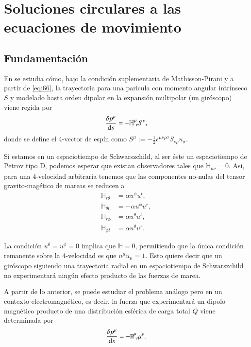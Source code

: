 \chapter{Soluciones circulares a las ecuaciones de movimiento}
\label{cap:4}
\newpage

\section{Fundamentación}

En \cite{Costa-Natario-Zilhao} se estudia cómo, bajo la condición suplementaria de Mathisson-Pirani y a partir de \eqref{eq:66}, la trayectoria para una paricula con momento angular intrínseco $S$ y modelado hasta orden dipolar en la expansión multipolar (un giróscopo) viene regida por
\begin{equation}
\frac{\delta p^{\mu}}{\mathrm{d}s} = -\mathbb{H}^{\mu}_{\ \nu} S^{\nu},
\end{equation}
donde se define el 4-vector de espín como $S^{\mu} := -\frac{1}{2} \epsilon^{\mu \nu \rho \sigma} S_{\nu \rho} u_{\sigma}$.

Si estamos en un espaciotiempo de Schwarszchild, al ser éste un espaciotiempo de Petrov tipo D, podemos esperar que existan observadores tales que $\mathbb{H}_{\mu \nu}=0$. Así, para una 4-velocidad arbitraria tenemos que las componentes no-nulas del tensor gravito-magético de mareas se reducen a
\begin{align}
\mathbb{H}_{r \theta} &= \alpha u^{\phi} u^{t},\\
\mathbb{H}_{\theta t} &= -\alpha u^{\phi} u^{r},\\
\mathbb{H}_{r \phi} &= \alpha u^{\theta} u^{t},\\
\mathbb{H}_{\phi t} &= \alpha u^{\theta} u^{r}.
\end{align}

La condición $u^{\theta} = u^{\phi} = 0$ implica que $\mathbb{H}=0$, permitiendo que la única condición remanente sobre la 4-velocidad es que $u^{\mu} u_{\mu} = 1$. Esto quiere decir que un giróscopo siguiendo una trayectoria radial en un espaciotiempo de Schwarszchild no experimentará ningún efecto producto de las fuerzas de marea.

A partir de lo anterior, se puede estudiar el problema análogo pero en un contexto electromagnético, es decir, la fuerza que experimentará un dipolo magnético producto de una distribución esférica de carga total $Q$ viene determinada por
\begin{equation}
\label{eq:magforce}
\frac{\delta p^{\mu}}{\mathrm{d}s} = -\mathtt{H}^{\mu}_{\ \nu} \mu^{\nu}.
\end{equation}

